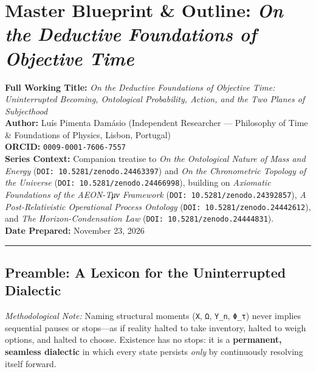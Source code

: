 \documentclass[
]{article}
\author{}
\date{}
\begin{document}
\section{\texorpdfstring{Master Blueprint \& Outline: \emph{On the
Deductive Foundations of Objective
Time}}{Master Blueprint \& Outline: On the Deductive Foundations of Objective Time}}\label{master-blueprint-outline-on-the-deductive-foundations-of-objective-time}

\textbf{Full Working Title:} \emph{On the Deductive Foundations of
Objective Time: Uninterrupted Becoming, Ontological Probability, Action,
and the Two Planes of Subjecthood}\\
\textbf{Author:} Luís Pimenta Damásio (Independent Researcher ---
Philosophy of Time \& Foundations of Physics, Lisbon, Portugal)\\
\textbf{ORCID:} \texttt{0009-0001-7606-7557}\\
\textbf{Series Context:} Companion treatise to \emph{On the Ontological
Nature of Mass and Energy} (\texttt{DOI:~10.5281/zenodo.24463397}) and
\emph{On the Chronometric Topology of the Universe}
(\texttt{DOI:~10.5281/zenodo.24466998}), building on \emph{Axiomatic
Foundations of the AEON-Tμν Framework}
(\texttt{DOI:~10.5281/zenodo.24392857}), \emph{A Post-Relativistic
Operational Process Ontology} (\texttt{DOI:~10.5281/zenodo.24442612}),
and \emph{The Horizon-Condensation Law}
(\texttt{DOI:~10.5281/zenodo.24444831}).\\
\textbf{Date Prepared:} November 23, 2026

\begin{center}\rule{0.5\linewidth}{0.5pt}\end{center}

\subsection{Preamble: A Lexicon for the Uninterrupted
Dialectic}\label{preamble-a-lexicon-for-the-uninterrupted-dialectic}

\emph{Methodological Note:} Naming structural moments (\texttt{X},
\texttt{Ω}, \texttt{\textquotesingle{}Y\_n}, \texttt{Φ\_τ}) never
implies sequential pauses or stops---as if reality halted to take
inventory, halted to weigh options, and halted to choose. Existence has
no stops: it is a \textbf{permanent, seamless dialectic} in which every
state persists \emph{only} by continuously resolving itself forward.
\end{document}
